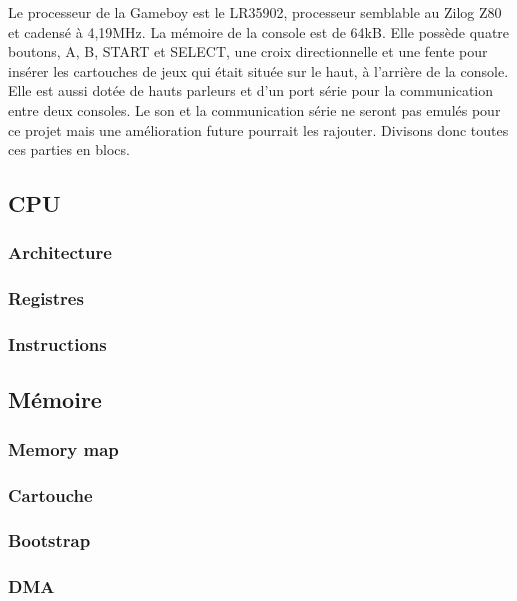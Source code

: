 \documentclass[a4paper]{article}
\begin{document}
Le processeur de la Gameboy est le LR35902, processeur semblable au Zilog Z80 et
cadensé à 4,19MHz. La mémoire de la console est de 64kB. Elle possède quatre boutons, 
A, B, START et SELECT, une croix directionnelle et une fente pour insérer les 
cartouches de jeux qui était située sur le haut, à l'arrière de la console. Elle est
aussi dotée de hauts parleurs et d'un port série pour la communication entre deux
consoles. Le son et la communication série ne seront pas emulés pour ce projet
mais une amélioration future pourrait les rajouter. Divisons donc toutes ces parties
en blocs.


\subsection{CPU}
\subsubsection{Architecture}

\subsubsection{Registres}

\subsubsection{Instructions}


\subsection{Mémoire}
\subsubsection{Memory map}

\subsubsection{Cartouche}

\subsubsection{Bootstrap}

\subsubsection{DMA}
\end{document}
